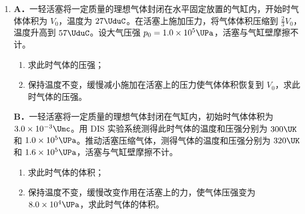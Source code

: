 \documentclass[\gkver]{gaokaozhenti}
\begin{document}
\begin{enumerate}

\item
\textbf{A．}一轻活塞将一定质量的理想气体封闭在水平固定放置的气缸内，开始时气体体积为 $V_{0}$，温度为 $27\UduC$。在活塞上施加压力，将气体体积压缩到 $\frac{2}{3}V_{0}$，温度升高到 $57\UduC$。设大气压强 $p_{0}=1.0\times10^{5}\UPa$，活塞与气缸壁摩擦不计。

\begin{enumerate}
	\item
	求此时气体的压强；
	\item
	保持温度不变，缓慢减小施加在活塞上的压力使气体体积恢复到 $V_{0}$，求此时气体的压强。
\end{enumerate}

\textbf{B．}一轻活塞将一定质量的理想气体封闭在气缸内，初始时气体体积为 $3.0\times10^{-3}\Umc$。用 DIS 实验系统测得此时气体的温度和压强分别为 $300\UK$ 和 $1.0\times10^{5}\UPa$。推动活塞压缩气体，测得气体的温度和压强分别为 $320\UK$ 和 $1.6\times10^{5}\UPa$，活塞与气缸壁摩擦不计。

\begin{enumerate}
	\item
	求此时气体的体积；
	\item
	保持温度不变，缓慢改变作用在活塞上的力，使气体压强变为 $8.0\times10^{4}\UPa$，求此时气体的体积。
\end{enumerate}


\end{enumerate}
\end{document}
